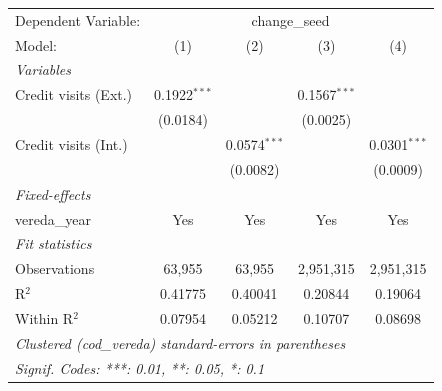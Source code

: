 
\begingroup
\centering
\begin{tabular}{lcccc}
   \tabularnewline \midrule \midrule
   Dependent Variable: & \multicolumn{4}{c}{change\_seed}\\
   Model:               & (1)            & (2)            & (3)            & (4)\\  
   \midrule
   \emph{Variables}\\
   Credit visits (Ext.) & 0.1922$^{***}$ &                & 0.1567$^{***}$ &   \\   
                        & (0.0184)       &                & (0.0025)       &   \\   
   Credit visits (Int.) &                & 0.0574$^{***}$ &                & 0.0301$^{***}$\\   
                        &                & (0.0082)       &                & (0.0009)\\   
   \midrule
   \emph{Fixed-effects}\\
   vereda\_year         & Yes            & Yes            & Yes            & Yes\\  
   \midrule
   \emph{Fit statistics}\\
   Observations         & 63,955         & 63,955         & 2,951,315      & 2,951,315\\  
   R$^2$                & 0.41775        & 0.40041        & 0.20844        & 0.19064\\  
   Within R$^2$         & 0.07954        & 0.05212        & 0.10707        & 0.08698\\  
   \midrule \midrule
   \multicolumn{5}{l}{\emph{Clustered (cod\_vereda) standard-errors in parentheses}}\\
   \multicolumn{5}{l}{\emph{Signif. Codes: ***: 0.01, **: 0.05, *: 0.1}}\\
\end{tabular}
\par\endgroup


